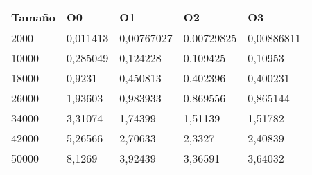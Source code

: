 \begin{tabular}{|l|l|l|l|l|}
	\hline
	Tamaño & O0 & O1 & O2 & O3 \\
	\hline
	\hline
	2000 & 0,011413 & 0,00767027 & 0,00729825 & 0,00886811 \\
	\hline
	10000 & 0,285049 & 0,124228 & 0,109425 & 0,10953 \\
	\hline
	18000 & 0,9231 & 0,450813 & 0,402396 & 0,400231 \\
	\hline
	26000 & 1,93603 & 0,983933 & 0,869556 & 0,865144 \\
	\hline
	34000 & 3,31074 & 1,74399 & 1,51139 & 1,51782 \\
	\hline
	42000 & 5,26566 & 2,70633 & 2,3327 & 2,40839 \\
	\hline
	50000 & 8,1269 & 3,92439 & 3,36591 & 3,64032 \\
	\hline
\end{tabular}
